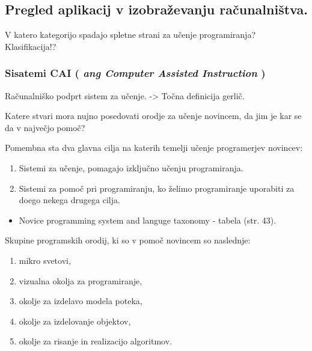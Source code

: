 
\subsection{Pregled aplikacij v izobraževanju
računalništva.}\label{pregled-aplikavij-v-izobraux17eevanju-raux10dunalniux161tva.}

V katero kategorijo spadajo spletne strani za učenje programiranja?
Klasifikacija!?

\subsubsection{\texorpdfstring{Sisatemi CAI ( \emph{ang Computer
Assisted Instruction}
)}{Sisatemi CAI ( ang Computer Assisted Instruction )}}\label{sisatemi-cai-ang-computer-assisted-instruction}

Računalniško podprt sistem za učenje. -\textgreater{} Točna definicija
gerlič.

Katere stvari mora nujno posedovati orodje za učenje novincem, da jim je
kar se da v največjo pomoč?

Pomembna sta dva glavna cilja na katerih temelji učenje programerjev
novincev:

\begin{enumerate}
\def\labelenumi{\arabic{enumi}.}
\item
  Sistemi za učenje, pomagajo izključno učenju programiranja.
\item
  Sistemi za pomoč pri programiranju, ko želimo programiranje uporabiti
  za doego nekega drugega cilja.
\end{enumerate}

\begin{itemize}
\item
  Novice programming system and languge taxonomy - tabela (str. 43).
\end{itemize}

Skupine programskih orodij, ki so v pomoč novincem so naslednje:

\begin{enumerate}
\def\labelenumi{\arabic{enumi}.}
\item
  mikro svetovi,
\item
  vizualna okolja za programiranje,
\item
  okolje za izdelavo modela poteka,
\item
  okolje za izdelovanje objektov,
\item
  okolje za risanje in realizacijo algoritmov.
\end{enumerate}

